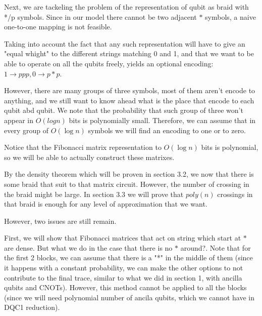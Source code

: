 \documentclass{article}
\begin{document}
Next, we are tackeling the problem of the representation of qubit as braid with */p symbols. Since in our model there cannot be two adjacent $*$ symbols, a naive one-to-one mapping is not feasible.

Taking into account the fact that any such representation will have to give an "equal whight" to the different strings matching 0 and 1, and that we want to be able to operate on all the qubits freely, yields an optional encoding: $1 \rightarrow ppp, 0 \rightarrow p*p$.

However, there are many groups of three symbols, most of them aren't encode to anything, and we still want to know ahead what is the place that encode to each qubit abd qubit. We note that the probability that such group of three won't appear in $O(logn)$ bits is polynomially small. Therefore, we can assume that in every group of $O(\log{n})$ symbols we will find an encoding to one or to zero.

Notice that the Fibonacci matrix representation to $O(\log{n})$ bits is polynomial, so we will be able to actually construct these matrixes.

By the density theorem which will be proven in section 3.2, we now that there is some braid that suit to that matrix circuit. However, the number of crossing in the braid might be large. In section 3.3 we will prove that $poly(n)$ crossings in that braid is enough for any level of approximation that we want.

However, two issues are still remain.

First, we will show that Fibonacci matrices that act on string which start at $*$ are dense. But what we do in the case that there is no $*$ around?. Note that for the first 2 blocks, we can assume that there is a "*" in the middle of them (since it happens with a constant probability, we can make the other options to not contribute to the final trace, similar to what we did in section 1, with ancilla qubits and CNOTs). However, this method cannot be applied to all the blocks (since we will need polynomial number of ancila qubits, which we cannot have in DQC1 reduction).
\end{document}
